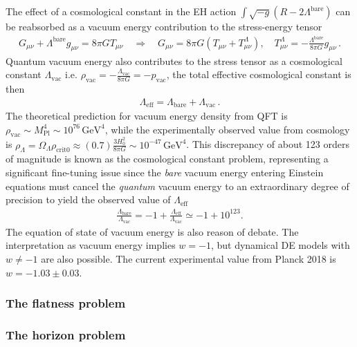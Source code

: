 The effect of a cosmological constant in the EH action $\int \sqrt{-g} (R-2\Lambda^\mathrm{bare})$ can be reabsorbed as a vacuum energy contribution to the stress-energy tensor
\begin{align}
    G_{\mu\nu}+\Lambda^\mathrm{bare} g_{\mu\nu} = 8\pi G T_{\mu\nu}  \quad \Rightarrow \quad G_{\mu\nu} = 8\pi G \left(T_{\mu\nu} + T^\Lambda_{\mu\nu}\right), \quad T^\Lambda_{\mu\nu} = -\frac{\Lambda^\mathrm{bare}}{8\pi G} g_{\mu\nu}\,.
\end{align}
Quantum vacuum energy also contributes to the stress tensor as a cosmological constant $\Lambda_{\mathrm{vac}}$ i.e. $\rho_{\mathrm{vac}}= -\frac{\Lambda_{\mathrm{vac}}}{8\pi G} = -p_{\mathrm{vac}}$, the total effective cosmological constant is then
\begin{align}
    \Lambda_{\mathrm{eff}} = \Lambda_\mathrm{bare} + \Lambda_{\mathrm{vac}}\,.
\end{align}
The theoretical prediction for vacuum energy density from QFT is $\rho_{\mathrm{vac}} \sim M_{\mathrm{Pl}}^4 \sim 10^{76} \, \mathrm{GeV}^4$, while the experimentally observed value from cosmology is $\rho_{\Lambda} = \Omega_\Lambda \rho_{\mathrm{crit} 0} \approx (0.7)\tfrac{3H_0^2}{8\pi G}\sim 10^{-47} \, \mathrm{GeV}^4$.
This discrepancy of about 123 orders of magnitude is known as the cosmological constant problem, representing a significant fine-tuning issue since the \emph{bare} vacuum energy entering Einstein equations must cancel the \emph{quantum} vacuum energy to an extraordinary degree of precision to yield the observed value of $\Lambda_{\mathrm{eff}}$
\begin{align}
    \frac{\Lambda_{\mathrm{bare}}}{\Lambda_{\mathrm{vac}}} = -1 + \frac{\Lambda_{\mathrm{eff}}}{\Lambda_{\mathrm{vac}}} \simeq -1 + 10^{123}.
\end{align}
The equation of state of vacuum energy is also reason of debate.
The interpretation as vacuum energy implies $w=-1$, but dynamical DE models with $w\neq -1$ are also possible.
The current experimental value from Planck 2018 is $w=-1.03\pm 0.03$.


\subsubsection*{The flatness problem}


\subsubsection*{The horizon problem}



